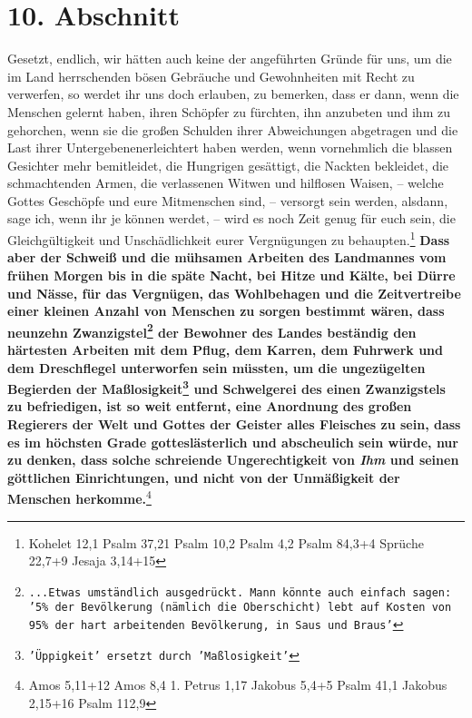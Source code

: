 \section{10. Abschnitt} \label{kap18_ab10}

Gesetzt, endlich, wir hätten auch keine der angeführten Gründe für uns, um die
im Land herrschenden bösen Gebräuche und Gewohnheiten mit Recht zu verwerfen,
so werdet ihr uns doch erlauben, zu bemerken, dass er dann, wenn die Menschen
gelernt haben, ihren Schöpfer zu fürchten, ihn anzubeten und ihm zu
gehorchen, wenn sie die großen Schulden ihrer Abweichungen abgetragen und die
Last ihrer Untergebenenerleichtert haben werden, wenn vornehmlich die blassen
Gesichter mehr bemitleidet, die Hungrigen gesättigt, die Nackten bekleidet, die
schmachtenden Armen, die verlassenen Witwen und hilflosen Waisen, -- welche
Gottes Geschöpfe und eure Mitmenschen sind, -- versorgt sein werden, alsdann,
sage ich, wenn ihr je können werdet, -- wird es noch Zeit genug für euch sein,
die Gleichgültigkeit und Unschädlichkeit eurer Vergnügungen zu
behaupten.\footnote{
Kohelet 12,1
Psalm 37,21
Psalm 10,2
Psalm 4,2
Psalm 84,3+4
Sprüche 22,7+9
Jesaja 3,14+15}
\label{ref:18_10_ungeraechtikeit} \textbf{Dass aber der Schweiß und die mühsamen
Arbeiten
des Landmannes vom frühen Morgen bis in die späte Nacht, bei Hitze und Kälte,
bei Dürre und Nässe, für das Vergnügen, das Wohlbehagen und die Zeitvertreibe
einer kleinen Anzahl von Menschen zu sorgen bestimmt wären, dass neunzehn
Zwanzigstel\footnote{\texttt{...Etwas umständlich ausgedrückt. Mann könnte auch
einfach sagen: '5\% der Bevölkerung (nämlich die Oberschicht) lebt auf Kosten
von 95\% der hart arbeitenden Bevölkerung, in Saus und Braus'}} der Bewohner
des Landes beständig den härtesten Arbeiten mit dem
Pflug, dem Karren, dem Fuhrwerk und dem Dreschflegel unterworfen sein müssten,
um
die ungezügelten Begierden der Maßlosigkeit\footnote{\texttt{'Üppigkeit' ersetzt
durch 'Maßlosigkeit'}} und Schwelgerei des
einen Zwanzigstels
zu befriedigen, ist so weit entfernt, eine Anordnung des großen Regierers der
Welt und Gottes der Geister alles Fleisches zu sein, dass es im höchsten Grade
gotteslästerlich und abscheulich sein würde, nur zu denken, dass solche
schreiende Ungerechtigkeit von \textit{Ihm} und seinen göttlichen Einrichtungen,
und
nicht von der Unmäßigkeit der Menschen herkomme.}\footnote{
Amos 5,11+12
Amos 8,4
1. Petrus 1,17
Jakobus 5,4+5
Psalm 41,1
Jakobus 2,15+16
Psalm 112,9}

